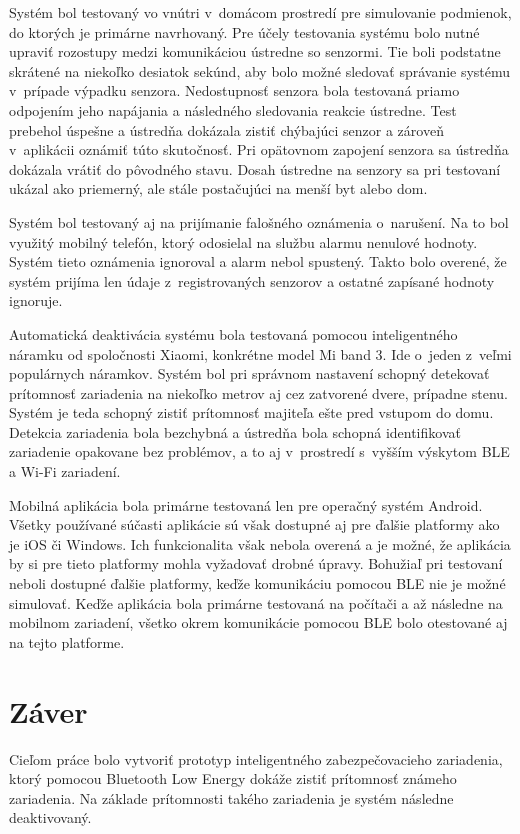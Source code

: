 Systém bol testovaný vo vnútri v~domácom prostredí pre simulovanie podmienok, do ktorých je primárne navrhovaný. Pre účely testovania systému bolo nutné upraviť rozostupy medzi komunikáciou ústredne so senzormi. Tie boli podstatne skrátené na niekoľko desiatok sekúnd, aby bolo možné sledovať správanie systému v~prípade výpadku senzora. Nedostupnosť senzora bola testovaná priamo odpojením jeho napájania a následného sledovania reakcie ústredne. Test prebehol úspešne a ústredňa dokázala zistiť chýbajúci senzor a zároveň v~aplikácii oznámiť túto skutočnosť. Pri opätovnom zapojení senzora sa ústredňa dokázala vrátiť do pôvodného stavu. Dosah ústredne na senzory sa pri testovaní ukázal ako priemerný, ale stále postačujúci na menší byt alebo dom.

Systém bol testovaný aj na prijímanie falošného oznámenia o~narušení. Na to bol využitý mobilný telefón, ktorý odosielal na službu alarmu nenulové hodnoty. Systém tieto oznámenia ignoroval a alarm nebol spustený. Takto bolo overené, že systém prijíma len údaje z~registrovaných senzorov a ostatné zapísané hodnoty ignoruje.

Automatická deaktivácia systému bola testovaná pomocou inteligentného náramku od spoločnosti Xiaomi, konkrétne model Mi band 3. Ide o~jeden z~veľmi populárnych náramkov. Systém bol pri správnom nastavení schopný detekovať prítomnosť zariadenia na niekoľko metrov aj cez zatvorené dvere, prípadne stenu. Systém je teda schopný zistiť prítomnosť majiteľa ešte pred vstupom do domu. Detekcia zariadenia bola bezchybná a ústredňa bola schopná identifikovať zariadenie opakovane bez problémov, a to aj v~prostredí s~vyšším výskytom BLE a Wi-Fi zariadení. 

Mobilná aplikácia bola primárne testovaná len pre operačný systém Android. Všetky používané súčasti aplikácie sú však dostupné aj pre ďalšie platformy ako je iOS či Windows. Ich funkcionalita však nebola overená a je možné, že aplikácia by si pre tieto platformy mohla vyžadovať drobné úpravy. Bohužiaľ pri testovaní neboli dostupné ďalšie platformy, keďže komunikáciu pomocou BLE nie je možné simulovať. Keďže aplikácia bola primárne testovaná na počítači a až následne na mobilnom zariadení, všetko okrem komunikácie pomocou BLE bolo otestované aj na tejto platforme. 


\chapter{Záver}

Cieľom práce bolo vytvoriť prototyp inteligentného zabezpečovacieho zariadenia, ktorý pomocou Bluetooth Low Energy dokáže zistiť prítomnosť známeho zariadenia. Na základe prítomnosti takého zariadenia je systém následne deaktivovaný.


